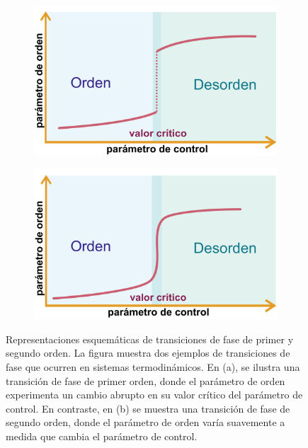\begin{figure}[ht]
	\centering
	\begin{subfigure}[b]{0.45\textwidth}
		\centering
		\includegraphics[width=\textwidth]{transiciones_fases_tipo_I.pdf}
		\caption{}
		\label{fig:transicionI}
	\end{subfigure}
	\begin{subfigure}[b]{0.45\textwidth}
		\centering
		\includegraphics[width=\textwidth]{transiciones_fases_tipo_II.pdf}
		\caption{}
		\label{fig:transicionII}
	\end{subfigure}
	\caption[Representaciones esquemáticas de transiciones de fase de primer y segundo orden.]{Representaciones esquemáticas de transiciones de fase de primer y segundo orden. La figura muestra dos ejemplos de transiciones de fase que ocurren en sistemas termodinámicos. En (a), se ilustra una transición de fase de primer orden, donde el parámetro de orden experimenta un cambio abrupto en su valor crítico del parámetro de control. En contraste, en (b) se muestra una transición de fase de segundo orden, donde el parámetro de orden varía suavemente a medida que cambia el parámetro de control.}
	\label{fig:trancisiones}
\end{figure}


